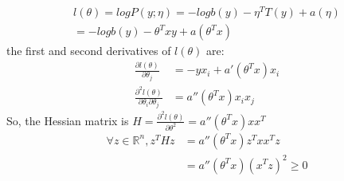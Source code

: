 \begin{answer}
\begin{align*}
    l(\theta) = log P(y;\eta) = -log b(y)-\eta^T T(y)+a(\eta)\\
    =-log b(y) - \theta^T x y + a(\theta^T x)
\end{align*}
the first and second derivatives of $l(\theta)$ are:
\begin{align*}
    \frac{\partial l(\theta)}{\partial \theta_j} &= -y x_i + a'(\theta^T x)x_i\\
    \frac{\partial^2 l(\theta)}{\partial \theta_i \partial \theta_j} &= a''(\theta^T x)x_i x_j
\end{align*}
So, the Hessian matrix is $H = \frac{\partial^2 l(\theta)}{\partial \theta^2} = a''(\theta^T x) x x^T$
\begin{align*}
    \forall z \in \mathbb{R}^n, z^T H z &= a''(\theta^T x) z^T x x^T z\\
    &= a''(\theta^T x) (x^T z)^2 \geq 0
\end{align*}
\end{answer}
